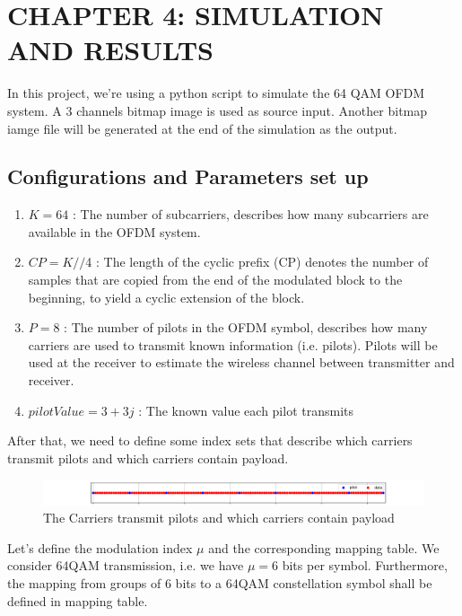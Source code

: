 \section*{CHAPTER 4: SIMULATION AND RESULTS}
\setcounter{section}{4}
\setcounter{subsection}{0}
\setcounter{figure}{0}
\setcounter{table}{0}

In this project, we're using a python script to simulate the 64 QAM OFDM system. A 3 channels bitmap image is used as source input. Another bitmap iamge file will be generated at the end of the simulation as the output.

\subsection{Configurations and Parameters set up}

\begin{enumerate}
    \item $K = 64$ : The number of subcarriers, describes how many subcarriers are available in the OFDM system.
    \item $CP = K//$4 : The length of the cyclic prefix (CP) denotes the number of samples that are copied from the end of the modulated block to the beginning, to yield a cyclic extension of the block.
    \item $P = 8$ : The number of pilots in the OFDM symbol, describes how many carriers are used to transmit known information (i.e. pilots). Pilots will be used at the receiver to estimate the wireless channel between transmitter and receiver.
    \item $pilotValue = 3+3j$ : The known value each pilot transmits
\end{enumerate}

After that, we need to define some index sets that describe which carriers transmit pilots and which carriers contain payload.

\begin{figure}[htbp]
    \centering
    \includegraphics[width=\linewidth]{../Source/results/Carrier_index.png}
    \caption{The Carriers transmit pilots and which carriers contain payload}
\end{figure}

Let's define the modulation index $\mu$ and the corresponding mapping table. We consider 64QAM transmission, i.e. we have $\mu=6$ bits per symbol. Furthermore, the mapping from groups of 6 bits to a 64QAM constellation symbol shall be defined in mapping table.

